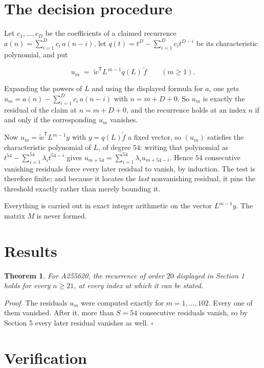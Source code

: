 \documentclass[11pt]{article}
\newtheorem{theorem}{Theorem}
\theoremstyle{definition}
\begin{document}
\section{The decision procedure}

Let $c_1,\dots,c_D$ be the coefficients of a claimed recurrence $a(n) = \sum_{i=1}^{D} c_i\,a(n-i)$, let $q(t) = t^{D} - \sum_{i=1}^{D} c_i t^{D-i}$ be its characteristic polynomial, and put

\[u_m \;=\; \tilde w^{\mathsf T} L^{\,m-1} q(L)\,\tilde f \qquad (m \ge 1).\]

Expanding the powers of $L$ and using the displayed formula for $a$, one gets $u_m = a(n) - \sum_{i=1}^{D} c_i\,a(n-i)$ with $n = m + D + 0$. So $u_m$ is exactly the residual of the claim at $n = m + D + 0$, and the recurrence holds at an index $n$ if and only if the corresponding $u_m$ vanishes.

Now $u_m = \tilde w^{\mathsf T} L^{m-1} y$ with $y = q(L)\tilde f$ a fixed vector, so $(u_m)$ satisfies the characteristic polynomial of $L$, of degree $54$: writing that polynomial as $t^{54} - \sum_{i=1}^{54} \lambda_i t^{54-i}$ gives $u_{m+54} = \sum_{i=1}^{54} \lambda_i u_{m+54-i}$. Hence $54$ consecutive vanishing residuals force every later residual to vanish, by induction. The test is therefore finite; and because it locates the {\itshape last} nonvanishing residual, it pins the threshold exactly rather than merely bounding it.

Everything is carried out in exact integer arithmetic on the vector $L^{m-1}y$. The matrix $M$ is never formed.

\section{Results}

\begin{theorem} For A255620, the recurrence of order $20$ displayed in Section 1 holds for every $n \ge 21$, at every index at which it can be stated.\end{theorem}

{\itshape Proof.} The residuals $u_m$ were computed exactly for $m = 1,\dots,102$. Every one of them vanished. After it, more than $S = 54$ consecutive residuals vanish, so by Section 5 every later residual vanishes as well. $\square$

\section{Verification}
\end{document}
